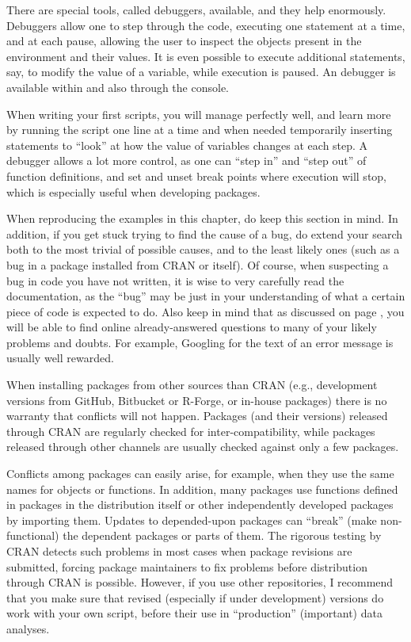 \documentclass[krantz2]{krantz}\usepackage{knitr}
\begin{document}
There are special tools, called debuggers, available, and they help enormously. Debuggers allow one to step through the code, executing one statement at a time, and at each pause, allowing the user to inspect the objects present in the \Rlang environment and their values. It is even possible to execute additional statements, say, to modify the value of a variable, while execution is paused. An \Rlang debugger is available within \RStudio and also through the \Rlang console.

When writing your first scripts, you will manage perfectly well, and learn more by running the script one line at a time and when needed temporarily inserting  statements to ``look'' at how the value of variables changes at each step. A debugger allows a lot more control, as one can ``step in'' and ``step out'' of function definitions, and set and unset break points where execution will stop, which is especially useful when developing \Rlang packages.

When reproducing the examples in this chapter, do keep this section in mind. In addition, if you get stuck trying to find the cause of a bug, do extend your search both to the most trivial of possible causes, and to the least likely ones (such as a bug in a package installed from CRAN or \Rlang itself). Of course, when suspecting a bug in code you have not written, it is wise to very carefully read the documentation, as the ``bug'' may be just in your understanding of what a certain piece of code is expected to do.  Also keep in mind that as discussed on page \pageref{sec:intro:net:help}, you will be able to find online already-answered questions to many of your likely problems and doubts. For example, Googling for the text of an error message is usually well rewarded.

\begin{warningbox}
When installing packages from other sources than CRAN (e.g.,  development versions from GitHub, Bitbucket or R-Forge, or in-house packages) there is no warranty that conflicts will not happen. Packages (and their versions) released through CRAN are regularly checked for inter-compatibility, while packages released through other channels are usually checked against only a few packages.

Conflicts among packages can easily arise, for example, when they use the same names for objects or functions. In addition, many packages use functions defined in packages in the \Rlang distribution itself or other independently developed packages by importing them. Updates to depended-upon packages can ``break'' (make non-functional) the dependent packages or parts of them. The rigorous testing by CRAN detects such problems in most cases when package revisions are submitted, forcing package maintainers to fix problems before distribution through CRAN is possible. However, if you use other repositories, I recommend that you make sure that revised (especially if under development) versions do work with your own script, before their use in ``production'' (important) data analyses.
\end{warningbox}
\end{document}
